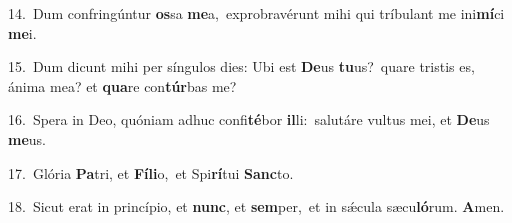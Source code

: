 {\numbfont\textcolor{\numbcolor}{14.}}~Dum confringúntur \textbf{os}\-sa \textbf{me}\-a,~\star exprobravérunt mihi qui tríbulant me ini\-\textbf{mí}\-ci \textbf{me}\-i.\par
{\numbfont\textcolor{\numbcolor}{15.}}~Dum dicunt mihi per síngulos dies: Ubi est \textbf{De}\-us \textbf{tu}\-us?~\star quare tristis es, ánima mea? et \textbf{qua}\-re con\-\textbf{túr}\-bas me?\par
{\numbfont\textcolor{\numbcolor}{16.}}~Spera in Deo, quóniam adhuc confi\-\textbf{té}\-bor \textbf{il}\-li:~\star salutáre vultus mei, et \textbf{De}\-us \textbf{me}\-us.\par
{\numbfont\textcolor{\numbcolor}{17.}}~Glória \textbf{Pa}\-tri, et \textbf{Fí}\-\textbf{li}o,~\star et Spi\-\textbf{rí}\-tui \textbf{Sanc}\-to.\par
{\numbfont\textcolor{\numbcolor}{18.}}~Sicut erat in princípio, et \textbf{nunc}\-, et \textbf{sem}\-per,~\star et in sǽcula sæcu\-\textbf{ló}\-rum. \textbf{A}\-men.\par
